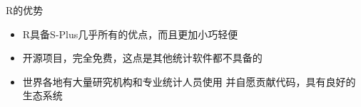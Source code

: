 \documentclass{beamerthemeMono}
\begin{document}
\begin{frame}[t]{\subsecname}{R的优势}
\begin{itemize}
\item<1-> R具备S-Plus几乎所有的优点，而且更加小巧轻便
\item<2-> 开源项目，完全免费，这点是其他统计软件都不具备的
\item<3-> 世界各地有大量研究机构和专业统计人员使用
                 并自愿贡献代码，具有良好的生态系统
\end{itemize}  

\begin{overlayarea}{\textwidth}{\textheight}


\end{overlayarea}

\end{frame} 
\end{document}
